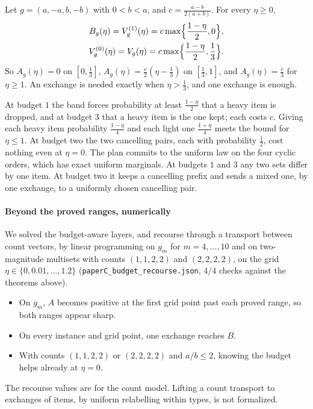 \begin{theorem}
\label{thm:fourrecourse}
Let $g=(a,-a,b,-b)$ with $0<b<a$, and $c=\frac{a-b}{2(a+b)}$. For every $\eta\ge0$,
\begin{gather*}
B_{g}(\eta)=V^{(1)}_{g}(\eta)=c\max\Bigl\{\frac{1-\eta}2,0\Bigr\},\\
V^{(0)}_{g}(\eta)=V_{g}(\eta)=c\max\Bigl\{\frac{1-\eta}2,\frac13\Bigr\}.
\end{gather*}
So $A_{g}(\eta)=0$ on $[0,\frac13]$, $A_g(\eta)=\frac c2(\eta-\frac13)$ on $[\frac13,1]$, and
$A_g(\eta)=\frac c3$ for $\eta\ge1$. An exchange is needed exactly when $\eta>\frac13$, and one
exchange is enough.
\end{theorem}

At budget $1$ the band forces probability at least $\frac{1-\eta}2$ that a heavy item is dropped,
and at budget $3$ that a heavy item is the one kept; each costs $c$. Giving each heavy item
probability $\frac{1-\eta}4$ and each light one $\frac{1+\eta}4$ meets the bound for $\eta\le1$. At budget two
the two cancelling pairs, each with probability $\frac12$, cost nothing even at $\eta=0$. The
plan commits to the uniform law on the four cyclic orders, which has exact uniform marginals.
At budgets $1$ and $3$ any two sets differ by one item. At budget two it keeps a cancelling
prefix and sends a mixed one, by one exchange, to a uniformly chosen cancelling pair.

\paragraph{Beyond the proved ranges, numerically} \NUM{} We solved the budget-aware layers, and
recourse through a transport between count vectors, by linear programming on $g_m$ for
$m=4,\dots,10$ and on two-magnitude multisets with counts $(1,1,2,2)$ and $(2,2,2,2)$, on the
grid $\eta\in\{0,0.01,\dots,1.2\}$ (\texttt{paperC\_budget\_recourse.json}, $4/4$ checks against
the theorems above).
\begin{itemize}
\item On $g_m$, $A$ becomes positive at the first grid point past each proved range, so both
ranges appear sharp.
\item On every instance and grid point, one exchange reaches $B$.
\item With counts $(1,1,2,2)$ or $(2,2,2,2)$ and $a/b\le2$, knowing the budget helps already at
$\eta=0$.
\end{itemize}
The recourse values are for the count model. Lifting a count transport to exchanges of items,
by uniform relabelling within types, is not formalized.

